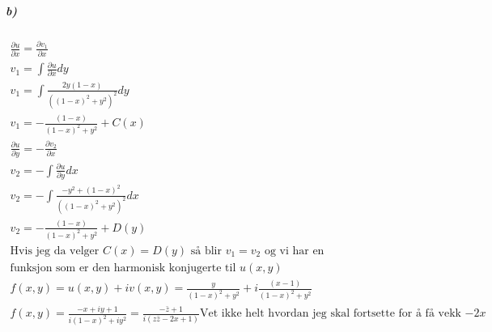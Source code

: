 \documentclass[11pt, A4paper,norsk]{article}
\begin{document}
			\subparagraph{b)}
				\begin{gather}
\frac{\partial u}{\partial x} = \frac{\partial v_1}{\partial x} \\
v_1 = \int \frac{\partial u}{\partial x} dy \\
v_1 = \int \frac{2y(1 - x)}{\left( (1 - x)^2 + y^2 \right)^2} dy \\
v_1 = - \frac{(1 - x)}{(1 - x)^2 + y^2} + C(x) \\
\frac{\partial u}{\partial y} = - \frac{\partial v_2}{\partial x} \\
v_2 = - \int \frac{\partial u}{\partial y} dx \\
v_2 = - \int \frac{- y^2 + (1 - x)^2}{\left( (1 - x)^2 + y^2 \right)^2} dx \\
v_2 = - \frac{(1 - x)}{(1 - x)^2 + y^2} + D(y) \\
\text{Hvis jeg da velger $C(x) = D(y)$ så blir $v_1 = v_2$ og vi har en} \nonumber \\
\text{funksjon som er den harmonisk konjugerte til $u(x, y)$} \nonumber \\
f(x, y) = u(x, y) + iv(x, y) = \frac{y}{(1 - x)^2 + y^2} + i \frac{(x - 1)}{(1 - x)^2 + y^2} \\
f(x, y) = \frac{-x + iy + 1}{i(1 - x)^2 + iy^2} = \frac{-\bar{z} + 1}{i(z\bar{z} - 2x + 1)}
\text{Vet ikke helt hvordan jeg skal fortsette for å få vekk $-2x$}
				\end{gather}
\end{document}
